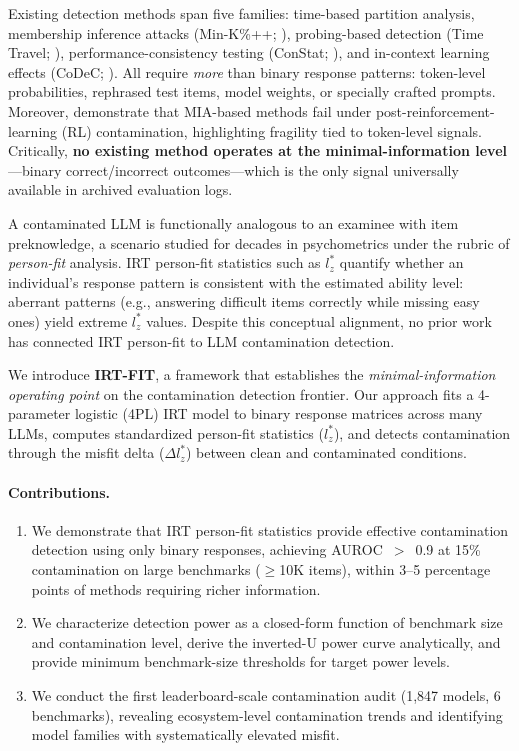 \documentclass[11pt,a4paper]{article}
\begin{document}
Existing detection methods span five families: time-based partition analysis, membership inference attacks (Min-K\%++; \citealt{shi2024detecting}), probing-based detection (Time Travel; \citealt{oren2024proving}), performance-consistency testing (ConStat; \citealt{li2024constat}), and in-context learning effects (CoDeC; \citealt{wu2026codec}).
All require \emph{more} than binary response patterns: token-level probabilities, rephrased test items, model weights, or specially crafted prompts.
Moreover, \citet{wang2025mia} demonstrate that MIA-based methods fail under post-reinforcement-learning (RL) contamination, highlighting fragility tied to token-level signals.
Critically, \textbf{no existing method operates at the minimal-information level}---binary correct/incorrect outcomes---which is the only signal universally available in archived evaluation logs.

A contaminated LLM is functionally analogous to an examinee with item preknowledge, a scenario studied for decades in psychometrics under the rubric of \emph{person-fit} analysis.
IRT person-fit statistics such as $l_z^*$ \citep{snijders2001} quantify whether an individual's response pattern is consistent with the estimated ability level: aberrant patterns (e.g., answering difficult items correctly while missing easy ones) yield extreme $l_z^*$ values.
Despite this conceptual alignment, no prior work has connected IRT person-fit to LLM contamination detection.

We introduce \textbf{IRT-FIT}, a framework that establishes the \emph{minimal-information operating point} on the contamination detection frontier.
Our approach fits a 4-parameter logistic (4PL) IRT model to binary response matrices across many LLMs, computes standardized person-fit statistics ($l_z^*$), and detects contamination through the misfit delta ($\Delta l_z^*$) between clean and contaminated conditions.

\paragraph{Contributions.}
\begin{enumerate}
\item We demonstrate that IRT person-fit statistics provide effective contamination detection using only binary responses, achieving AUROC~$>$~0.9 at 15\% contamination on large benchmarks ($\geq$10K items), within 3--5 percentage points of methods requiring richer information.
\item We characterize detection power as a closed-form function of benchmark size and contamination level, derive the inverted-U power curve analytically, and provide minimum benchmark-size thresholds for target power levels.
\item We conduct the first leaderboard-scale contamination audit (1{,}847 models, 6 benchmarks), revealing ecosystem-level contamination trends and identifying model families with systematically elevated misfit.
\end{enumerate}
\end{document}

